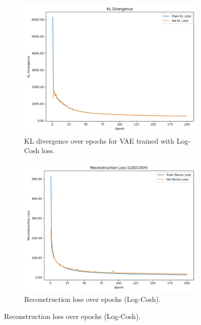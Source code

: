 \begin{figure}[htbp]
    \centering
    \begin{subfigure}[b]{0.45\textwidth}
        \includegraphics[width=\textwidth]{img/vae_results/200_epochs_128_ls_logcosh/logcosh_kl_loss.png}
        \caption{KL divergence over epochs for VAE trained with Log-Cosh loss.}
        \label{fig:logcosh_kl_loss}
    \end{subfigure}
    \hfill
    \begin{subfigure}[b]{0.45\textwidth}
        \includegraphics[width=\textwidth]{img/vae_results/200_epochs_128_ls_logcosh/logcosh_recon_loss.png}
        \caption{Reconstruction loss over epochs (Log-Cosh).}
        \label{fig:logcosh_recon_loss}
    \end{subfigure}
    

\end{figure}
